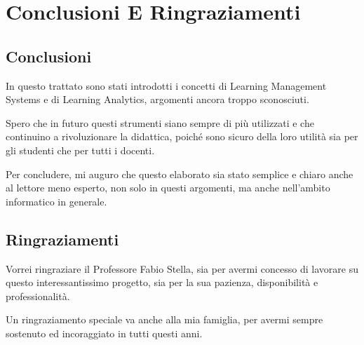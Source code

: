 \chapter{Conclusioni E Ringraziamenti}

\section{Conclusioni}
In questo trattato sono stati introdotti i concetti di Learning Management Systems e di Learning Analytics, argomenti ancora troppo sconosciuti. 

Spero che in futuro questi strumenti siano sempre di più utilizzati e che continuino a rivoluzionare la didattica, poiché sono sicuro della loro utilità sia per gli studenti che per tutti i docenti.

Per concludere, mi auguro che questo elaborato sia stato semplice e chiaro anche al lettore meno esperto, non solo in questi argomenti, ma anche nell'ambito informatico in generale.

\section{Ringraziamenti}

Vorrei ringraziare il Professore Fabio Stella, sia per avermi concesso di lavorare su questo interessantissimo progetto, sia per la sua pazienza, disponibilità e professionalità.

Un ringraziamento speciale va anche alla mia famiglia, per avermi sempre sostenuto ed incoraggiato in tutti questi anni.